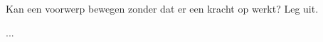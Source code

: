 

\item{}Kan een voorwerp bewegen zonder dat er een kracht op werkt? Leg uit.


\begin{oplossing}
...
\end{oplossing}